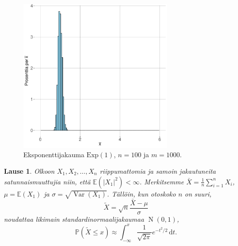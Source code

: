 \documentclass{beamer}
\newtheorem{teoreema}{Lause}
\DeclareMathOperator{\var}{Var}
\DeclareMathOperator{\n}{\mathrm N}
\begin{document}

\begin{frame}
  \begin{center}
    \begin{figure}
      \includegraphics[width=0.7\textwidth, height=0.7\textwidth]{exp-n-100.pdf}
      \caption{Eksponenttijakauma $\mathrm{Exp}\left(1\right)$, $n = 100$ ja $m = 1000$.}
  \end{figure}
\end{center}
\end{frame}


\begin{frame}
  \begin{teoreema}
    Olkoon $X_1, X_2, \ldots, X_n$ riippumattomia ja samoin jakautuneita
    satunnaismuuttujia niin, että $\mathbb{E}\left(\left|X_1\right|^2\right) <
    \infty$. Merkitsemme $\bar X = \frac{1}{n}\sum_{i = 1}^n X_i$, $\mu =
    \mathbb{E}\left(X_1\right)$ ja $\sigma = \sqrt{\var\left(X_1\right)}$.
    Tällöin, kun otoskoko $n$ on suuri,
    \begin{equation*}
      \tilde X = \sqrt{n}\frac{\bar X - \mu}{\sigma}
    \end{equation*}
    noudattaa likimain standardinormaalijakaumaa $\n\left(0, 1\right)$,
    \pause
    \begin{equation*}
      \mathbb{P}\left(\tilde X \leq x\right) \approx
      \int_{-\infty}^x \frac{1}{\sqrt{2\pi}}e^{-t^2/2}\,\mathrm{d}t.
    \end{equation*}
  \end{teoreema}
\end{frame}
\end{document}
